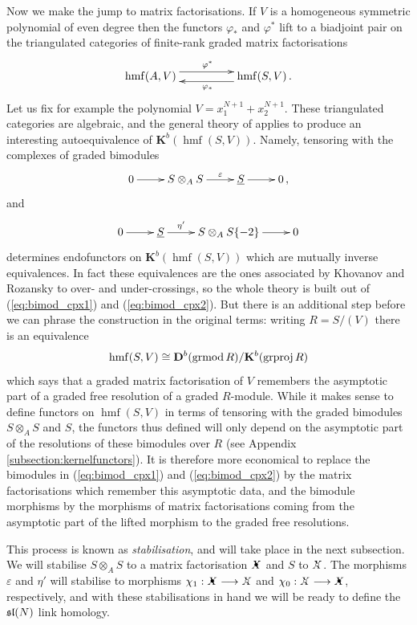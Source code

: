 \documentclass{compositio}
\theoremstyle{definition}
\numberwithin{equation}{section}
\def\K{\mathbf{K}}
\DeclareMathOperator{\hmf}{hmf}
\begin{document}
Now we make the jump to matrix factorisations. If $V$ is a homogeneous symmetric polynomial of even degree then the functors $\varphi_*$ and $\varphi^*$ lift to a biadjoint pair on the triangulated categories of finite-rank graded matrix factorisations
\[
\xymatrix@C+2pc{
\hmf(A, V) \ar@<1ex>[r]^{\varphi^*} & \hmf(S, V) \ar@<1ex>[l]^{\varphi_*} \, .
}
\]
Let us fix for example the polynomial $V = x_1^{N+1} + x_2^{N+1}$. These triangulated categories are algebraic, and the general theory of \cite{RouquierMexico} applies to produce an interesting autoequivalence of $\K^b( \hmf(S, V) )$. Namely, tensoring with the complexes of graded bimodules
\begin{equation}\label{eq:bimod_cpx1}
\xymatrix{
0 \ar[r] & S \otimes_A S \ar[r]^-{\varepsilon} & \underline{S} \ar[r] & 0 \, ,
}
\end{equation}
and
\begin{equation}\label{eq:bimod_cpx2}
\xymatrix{
0 \ar[r] & \underline{S} \ar[r]^-{\eta'} & S \otimes_A S\{-2\} \ar[r] & 0
}
\end{equation}
determines endofunctors on $\K^b( \hmf(S, V) )$ which are mutually inverse equivalences. In fact these equivalences are the ones associated by Khovanov and Rozansky to over- and under-crossings, so the whole theory is built out of (\ref{eq:bimod_cpx1}) and (\ref{eq:bimod_cpx2}). But there is an additional step before we can phrase the construction in the original terms: writing $R = S/(V)$ there is an equivalence
\[
\hmf(S, V) \cong \qderu{b}{\textup{grmod}\, R}/\K^b(\textup{grproj}\, R)
\]
which says that a graded matrix factorisation of $V$ remembers the asymptotic part of a graded free resolution of a graded $R$-module. While it makes sense to define functors on $\hmf(S,V)$ in terms of tensoring with the graded bimodules $S \otimes_A S$ and $S$, the functors thus defined will only depend on the asymptotic part of the resolutions of these bimodules over $R$ (see Appendix \ref{subsection:kernelfunctors}). It is therefore more economical to replace the bimodules in (\ref{eq:bimod_cpx1}) and (\ref{eq:bimod_cpx2}) by the matrix factorisations which remember this asymptotic data, and the bimodule morphisms by the morphisms of matrix factorisations coming from the asymptotic part of the lifted morphism to the graded free resolutions.

This process is known as \emph{stabilisation}, and will take place in the next subsection. We will stabilise $S \otimes_A S$ to a matrix factorisation $\Xbul$ and $S$ to $\Xcirc$. The morphisms $\varepsilon$ and $\eta'$ will stabilise to morphisms $\chi_1: \Xbul \lto \Xcirc$ and $\chi_0: \Xcirc \lto \Xbul$, respectively, and with these stabilisations in hand we will be ready to define the $\mathfrak{sl}(N)$ link homology.
\end{document}
